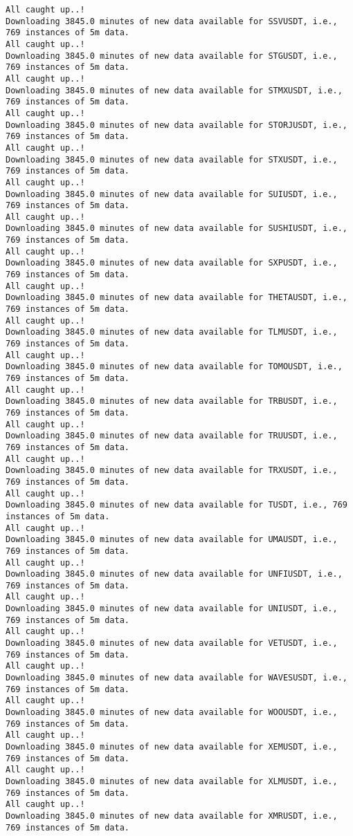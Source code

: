 \documentclass[
  letterpaper,
  DIV=11,
  numbers=noendperiod]{scrartcl}
\begin{document}
\begin{verbatim}
All caught up..!
Downloading 3845.0 minutes of new data available for SSVUSDT, i.e., 769 instances of 5m data.
All caught up..!
Downloading 3845.0 minutes of new data available for STGUSDT, i.e., 769 instances of 5m data.
All caught up..!
Downloading 3845.0 minutes of new data available for STMXUSDT, i.e., 769 instances of 5m data.
All caught up..!
Downloading 3845.0 minutes of new data available for STORJUSDT, i.e., 769 instances of 5m data.
All caught up..!
Downloading 3845.0 minutes of new data available for STXUSDT, i.e., 769 instances of 5m data.
All caught up..!
Downloading 3845.0 minutes of new data available for SUIUSDT, i.e., 769 instances of 5m data.
All caught up..!
Downloading 3845.0 minutes of new data available for SUSHIUSDT, i.e., 769 instances of 5m data.
All caught up..!
Downloading 3845.0 minutes of new data available for SXPUSDT, i.e., 769 instances of 5m data.
All caught up..!
Downloading 3845.0 minutes of new data available for THETAUSDT, i.e., 769 instances of 5m data.
All caught up..!
Downloading 3845.0 minutes of new data available for TLMUSDT, i.e., 769 instances of 5m data.
All caught up..!
Downloading 3845.0 minutes of new data available for TOMOUSDT, i.e., 769 instances of 5m data.
All caught up..!
Downloading 3845.0 minutes of new data available for TRBUSDT, i.e., 769 instances of 5m data.
All caught up..!
Downloading 3845.0 minutes of new data available for TRUUSDT, i.e., 769 instances of 5m data.
All caught up..!
Downloading 3845.0 minutes of new data available for TRXUSDT, i.e., 769 instances of 5m data.
All caught up..!
Downloading 3845.0 minutes of new data available for TUSDT, i.e., 769 instances of 5m data.
All caught up..!
Downloading 3845.0 minutes of new data available for UMAUSDT, i.e., 769 instances of 5m data.
All caught up..!
Downloading 3845.0 minutes of new data available for UNFIUSDT, i.e., 769 instances of 5m data.
All caught up..!
Downloading 3845.0 minutes of new data available for UNIUSDT, i.e., 769 instances of 5m data.
All caught up..!
Downloading 3845.0 minutes of new data available for VETUSDT, i.e., 769 instances of 5m data.
All caught up..!
Downloading 3845.0 minutes of new data available for WAVESUSDT, i.e., 769 instances of 5m data.
All caught up..!
Downloading 3845.0 minutes of new data available for WOOUSDT, i.e., 769 instances of 5m data.
All caught up..!
Downloading 3845.0 minutes of new data available for XEMUSDT, i.e., 769 instances of 5m data.
All caught up..!
Downloading 3845.0 minutes of new data available for XLMUSDT, i.e., 769 instances of 5m data.
All caught up..!
Downloading 3845.0 minutes of new data available for XMRUSDT, i.e., 769 instances of 5m data.

\end{verbatim}
\end{document}
